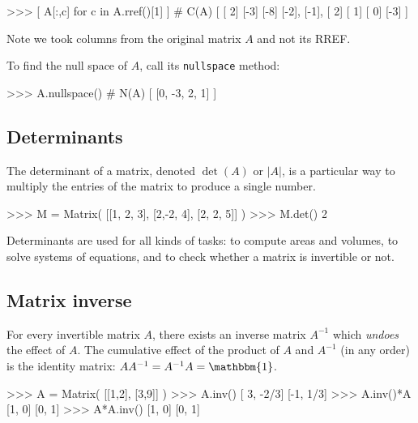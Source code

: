 \small
\begin{verbatimtab}
>>> [ A[:,c] for c in  A.rref()[1] ]                # C(A)
[  [ 2]    [-3]   [-8]
   [-2],   [-1],  [ 2]
   [ 1]    [ 0]   [-3]  ]
\end{verbatimtab}
\normalsize

\noindent
Note we took columns from the original matrix $A$ and not its RREF.


To find the null space of $A$, call its \texttt{nullspace} method:

\small
\begin{verbatimtab}
>>> A.nullspace()                                   # N(A)
[  [0, -3, 2, 1]  ]
\end{verbatimtab}
\normalsize
\subsection{Determinants}
\label{matrices:determinants}

The determinant of a matrix, 
denoted $\det(A)$ or $|A|$, 
is a particular way to multiply the entries of the matrix to produce a single number.



\small
\begin{verbatimtab}
>>> M = Matrix( [[1, 2, 3], 
                 [2,-2, 4],
                 [2, 2, 5]] )
>>> M.det()   
2
\end{verbatimtab}
\normalsize

\noindent
Determinants are used for all kinds of tasks:
to compute areas and volumes,
to solve systems of equations, 
and to check whether a matrix is invertible or not.

\subsection{Matrix inverse}
\label{matrices:matrix_inverse}

For every invertible matrix $A$,
there exists an inverse matrix $A^{-1}$ which \emph{undoes} the effect of $A$.
The cumulative effect of the product of $A$ and $A^{-1}$ (in any order)
is the identity matrix: $AA^{-1}= A^{-1}A=\mathbbm{1}$.



\small
\begin{verbatimtab}
>>> A = Matrix( [[1,2], 
                 [3,9]] ) 
>>> A.inv()                        
[ 3, -2/3]
[-1,  1/3]
>>> A.inv()*A
[1, 0]
[0, 1]
>>> A*A.inv()
[1, 0]
[0, 1]
\end{verbatimtab}
\normalsize


